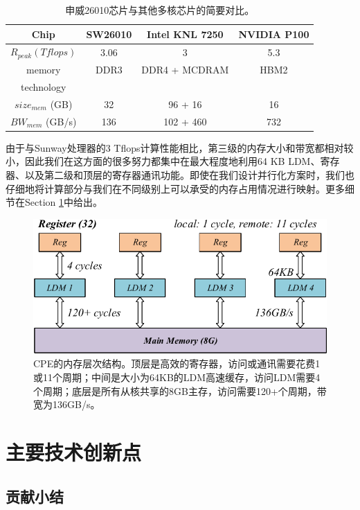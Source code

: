 \documentclass[degree=doctor]{thuthesis}
\begin{document}
\begin{table}[h]
\caption{申威26010芯片与其他多核芯片的简要对比。}
\label{tb:proc-comp}
\centering
\begin{tabular*}{0.8\columnwidth}{cccc}
\hline\hline
  Chip & SW26010 & Intel KNL 7250 & NVIDIA P100 \\\hline
    $R_{peak} (Tflops)$ & 3.06 & 3 & 5.3 \\\hline
    memory   & DDR3 & DDR4 + MCDRAM & HBM2 \\
    technology \\\hline
    $size_{mem}$ (GB) & 32 & 96 + 16 & 16 \\\hline
    $BW_{mem}$ (GB/s)  & 136 & 102 + 460 & 732 \\\hline
\hline
\end{tabular*}
\end{table}

由于与Sunway处理器的3 Tflops计算性能相比，第三级的内存大小和带宽都相对较小，因此我们在这方面的很多努力都集中在最大程度地利用64 KB LDM、寄存器、以及第二级和顶层的寄存器通讯功能。即使在我们设计并行化方案时，我们也仔细地将计算部分与我们在不同级别上可以承受的内存占用情况进行映射。更多细节在Section \ref{sec:contribution}中给出。

\begin{figure}[h]
\centering
\includegraphics[width=.9\columnwidth]{memory_hierarchy.pdf}
\caption{CPE的内存层次结构。顶层是高效的寄存器，访问或通讯需要花费1或11个周期；中间是大小为64KB的LDM高速缓存，访问LDM需要4个周期；底层是所有从核共享的8GB主存，访问需要120+个周期，带宽为136GB/s。}
\label{fig:sunway_mem}
\end{figure}

\section{主要技术创新点}
\label{sec:contribution}

\subsection{贡献小结}
\end{document}
